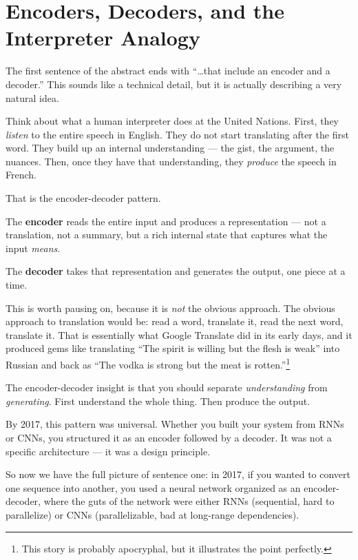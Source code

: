 \section{Encoders, Decoders, and the Interpreter Analogy}

The first sentence of the abstract ends with ``\ldots that include an encoder and a decoder.''
This sounds like a technical detail, but it is actually describing a very natural idea.

Think about what a human interpreter does at the United Nations.
First, they \emph{listen} to the entire speech in English.
They do not start translating after the first word.
They build up an internal understanding --- the gist, the argument, the nuances.
Then, once they have that understanding, they \emph{produce} the speech in French.

That is the encoder-decoder pattern.

The \textbf{encoder} reads the entire input and produces a representation --- not a translation, not a summary, but a rich internal state that captures what the input \emph{means}.

The \textbf{decoder} takes that representation and generates the output, one piece at a time.

This is worth pausing on, because it is \emph{not} the obvious approach.
The obvious approach to translation would be: read a word, translate it, read the next word, translate it.
That is essentially what Google Translate did in its early days, and it produced gems like translating ``The spirit is willing but the flesh is weak'' into Russian and back as ``The vodka is strong but the meat is rotten.''\footnote{This story is probably apocryphal, but it illustrates the point perfectly.}

The encoder-decoder insight is that you should separate \emph{understanding} from \emph{generating}.
First understand the whole thing.
Then produce the output.

By 2017, this pattern was universal.
Whether you built your system from RNNs or CNNs, you structured it as an encoder followed by a decoder.
It was not a specific architecture --- it was a design principle.

So now we have the full picture of sentence one: in 2017, if you wanted to convert one sequence into another, you used a neural network organized as an encoder-decoder, where the guts of the network were either RNNs (sequential, hard to parallelize) or CNNs (parallelizable, bad at long-range dependencies).

